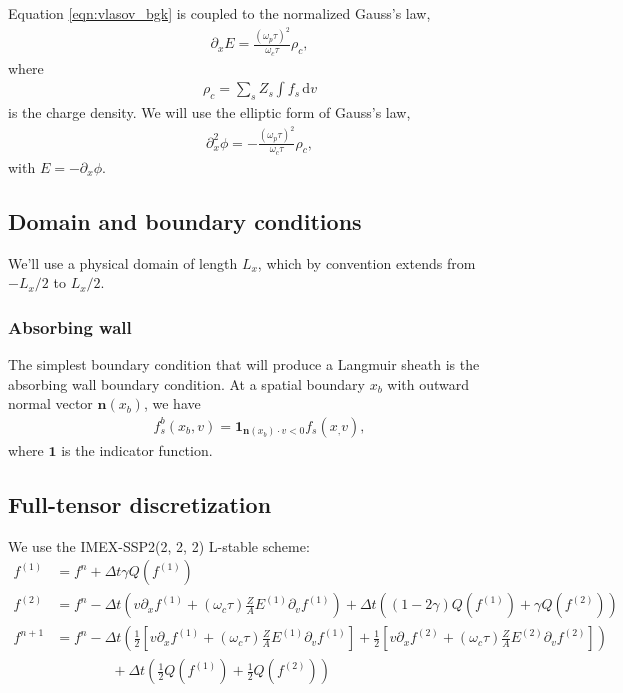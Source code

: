 \documentclass{article}
\begin{document}
Equation \eqref{eqn:vlasov_bgk} is coupled to the normalized Gauss's law,
\begin{align}
\partial_x E = \frac{(\omega_p \tau)^2}{\omega_c \tau} \rho_c,
\end{align}
where
\begin{align}
    \rho_c = \sum_s Z_s \int f_s \,\mathrm{d} v
\end{align}
is the charge density.
We will use the elliptic form of Gauss's law,
\begin{align}
\partial_x^2 \phi = -\frac{(\omega_p \tau)^2}{\omega_c \tau} \rho_c,
\end{align}
with $E = -\partial_x \phi$.

\subsection{Domain and boundary conditions}

We'll use a physical domain of length $L_x$, which by convention extends from $-L_x/2$ to $L_x/2$.

\subsubsection{Absorbing wall}
The simplest boundary condition that will produce a Langmuir sheath is the absorbing wall
boundary condition. At a spatial boundary $x_b$ with outward normal vector $\mathbf{n}(x_b)$, we have
\begin{align}
    f_s^b(x_b, v) = \mathbf{1}_{\mathbf{n}(x_b) \cdot v < 0} f_s(x_, v),
\end{align}
where $\mathbf{1}$ is the indicator function.

\subsection{Full-tensor discretization}

We use the IMEX-SSP2(2, 2, 2) L-stable scheme:
\begin{align*}
    f^{(1)} &= f^n + \Delta t \gamma Q(f^{(1)}) \\
    f^{(2)} &= f^n - \Delta t  \left( v \partial_x f^{(1)} + (\omega_c \tau) \frac{Z}{A} E^{(1)} \partial_v f^{(1)} \right) + \Delta t \left( (1 - 2\gamma) Q(f^{(1)}) + \gamma Q(f^{(2)}) \right)  \\
    f^{n+1} &= f^n - \Delta t \left( \frac{1}{2} \left[ v \partial_x f^{(1)} + (\omega_c \tau) \frac{Z}{A} E^{(1)} \partial_v f^{(1)} \right]  + \frac{1}{2} \left[ v \partial_x f^{(2)} + (\omega_c \tau) \frac{Z}{A} E^{(2)} \partial_v f^{(2)} \right] \right)  \\
            &\qquad \qquad + \Delta t \left( \frac{1}{2} Q(f^{(1)}) + \frac{1}{2} Q(f^{(2)}) \right) 
\end{align*}
\end{document}
